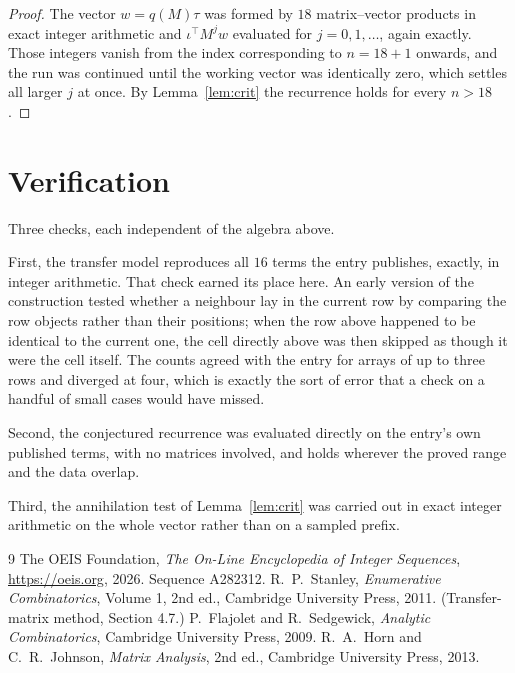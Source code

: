 \documentclass[11pt,a4paper]{article}
\theoremstyle{plain}
\theoremstyle{definition}
\begin{document}
\begin{proof}
The vector $w=q(M)\tau$ was formed by $18$ matrix--vector products in exact integer
arithmetic and $\iota^{\!\top}M^{j}w$ evaluated for $j=0,1,\dots$, again exactly. Those
integers vanish from the index corresponding to $n=18+1$ onwards, and the run was
continued until the working vector was identically zero, which settles all larger $j$ at once.
By Lemma~\ref{lem:crit} the recurrence holds for every $n>18$.
\end{proof}

\section{Verification}

Three checks, each independent of the algebra above.

First, the transfer model reproduces all $16$ terms the entry publishes, exactly, in
integer arithmetic. That check earned its place here. An early version of the construction
tested whether a neighbour lay in the current row by comparing the row objects rather
than their positions; when the row above happened to be identical to the current one, the
cell directly above was then skipped as though it were the cell itself. The counts agreed with
the entry for arrays of up to three rows and diverged at four, which is exactly the sort of
error that a check on a handful of small cases would have missed.

Second, the conjectured recurrence was evaluated directly on the entry's own published terms,
with no matrices involved, and holds wherever the proved range and the data overlap.

Third, the annihilation test of Lemma~\ref{lem:crit} was carried out in exact integer
arithmetic on the whole vector rather than on a sampled prefix.

\begin{thebibliography}{9}
 The OEIS Foundation, \emph{The On-Line Encyclopedia of Integer
Sequences}, \url{https://oeis.org}, 2026. Sequence A282312.
 R.~P.~Stanley, \emph{Enumerative Combinatorics}, Volume 1, 2nd ed.,
Cambridge University Press, 2011. (Transfer-matrix method, Section 4.7.)
 P.~Flajolet and R.~Sedgewick, \emph{Analytic Combinatorics}, Cambridge
University Press, 2009.
 R.~A.~Horn and C.~R.~Johnson, \emph{Matrix Analysis}, 2nd ed., Cambridge
University Press, 2013.
\end{thebibliography}
\end{document}
